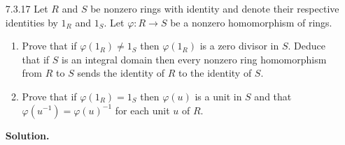 \begin{enumerate}
      \textbf{Proof.} Let $Z_R$ be the center of $R$. We want to show that
      $\varphi(Z_R)$ is in the center of $S$; i.e., every element in the image 
      of $\varphi$ commutes with every element of $S$. So let $s \in S$ and
      $y \in \varphi(Z_R)$; thus $y = \varphi(r)$ for some $r \in Z_R$ and since
      $\varphi$ is onto, there exists $x \in R$ such that $s = \varphi(x)$. So
      \begin{align*}
         ys &= \varphi(r)\varphi(x) \\
            &= \varphi(rx) &[\varphi \text{ is a ring homomorphism}] \\
            &= \varphi(xr) &[r \in Z_R] \\
            &= \varphi(x)\varphi(r) &[\varphi \text{ is a ring homomorphism}] \\
            &= sy,
      \end{align*}
      so that every element in the image of $\varphi$ commutes with every
      element of $S$. \qed
   \item[7.3.17]  Let $R$ and $S$ be nonzero rings with identity and denote
                  their respective identities by $1_R$ and $1_S$. Let
                  $\varphi : R \rightarrow S$ be a nonzero homomorphism of
                  rings.
                  \begin{enumerate}
                     \item Prove that if $\varphi(1_R) \neq 1_S$ then
                           $\varphi(1_R)$ is a zero divisor in $S$. Deduce that
                           if $S$ is an integral domain then every nonzero ring
                           homomorphism from $R$ to $S$ sends the identity of
                           $R$ to the identity of $S$.
                     \item Prove that if $\varphi(1_R) = 1_S$ then $\varphi(u)$
                           is a unit in $S$ and that
                           $\varphi(u^{-1}) = \varphi(u)^{-1}$ for each unit $u$ 
                           of $R$.
                  \end{enumerate}

      \textbf{Solution.}


\end{enumerate}
